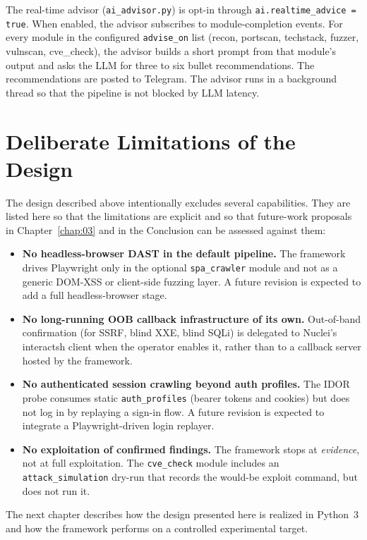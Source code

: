 The real-time advisor (\texttt{ai\_advisor.py}) is opt-in through \texttt{ai.realtime\_advice = true}. When enabled, the advisor subscribes to module-completion events. For every module in the configured \texttt{advise\_on} list (recon, portscan, techstack, fuzzer, vulnscan, cve\_check), the advisor builds a short prompt from that module's output and asks the LLM for three to six bullet recommendations. The recommendations are posted to Telegram. The advisor runs in a background thread so that the pipeline is not blocked by LLM latency.

\section{Deliberate Limitations of the Design}

The design described above intentionally excludes several capabilities. They are listed here so that the limitations are explicit and so that future-work proposals in Chapter~\ref{chap:03} and in the Conclusion can be assessed against them:

\begin{itemize}
  \item \textbf{No headless-browser DAST in the default pipeline.} The framework drives Playwright only in the optional \texttt{spa\_crawler} module and not as a generic DOM-XSS or client-side fuzzing layer. A future revision is expected to add a full headless-browser stage.
  \item \textbf{No long-running OOB callback infrastructure of its own.} Out-of-band confirmation (for SSRF, blind XXE, blind SQLi) is delegated to Nuclei's interactsh client when the operator enables it, rather than to a callback server hosted by the framework.
  \item \textbf{No authenticated session crawling beyond auth profiles.} The IDOR probe consumes static \texttt{auth\_profiles} (bearer tokens and cookies) but does not log in by replaying a sign-in flow. A future revision is expected to integrate a Playwright-driven login replayer.
  \item \textbf{No exploitation of confirmed findings.} The framework stops at \textit{evidence}, not at full exploitation. The \texttt{cve\_check} module includes an \texttt{attack\_simulation} dry-run that records the would-be exploit command, but does not run it.
\end{itemize}

The next chapter describes how the design presented here is realized in Python~3 and how the framework performs on a controlled experimental target.
